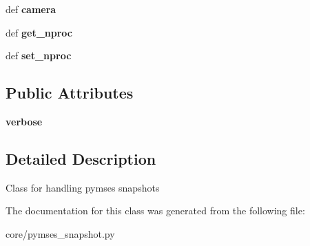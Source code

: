 \begin{DoxyCompactItemize}
\item 
\hypertarget{classseren3_1_1core_1_1pymses__snapshot_1_1PymsesSnapshot_a37f57d298fd6ce7eae2567bd27daf4b8}{
def {\bfseries camera}}
\label{classseren3_1_1core_1_1pymses__snapshot_1_1PymsesSnapshot_a37f57d298fd6ce7eae2567bd27daf4b8}

\item 
\hypertarget{classseren3_1_1core_1_1pymses__snapshot_1_1PymsesSnapshot_aec67f8b60cd90d2e118e163fdf991455}{
def {\bfseries get\_\-nproc}}
\label{classseren3_1_1core_1_1pymses__snapshot_1_1PymsesSnapshot_aec67f8b60cd90d2e118e163fdf991455}

\item 
\hypertarget{classseren3_1_1core_1_1pymses__snapshot_1_1PymsesSnapshot_a322203753f30c91e6ad52dfa06b75e44}{
def {\bfseries set\_\-nproc}}
\label{classseren3_1_1core_1_1pymses__snapshot_1_1PymsesSnapshot_a322203753f30c91e6ad52dfa06b75e44}

\end{DoxyCompactItemize}
\subsection*{Public Attributes}
\begin{DoxyCompactItemize}
\item 
\hypertarget{classseren3_1_1core_1_1pymses__snapshot_1_1PymsesSnapshot_afd83ef6d81e85a4e8ad298003484d5bf}{
{\bfseries verbose}}
\label{classseren3_1_1core_1_1pymses__snapshot_1_1PymsesSnapshot_afd83ef6d81e85a4e8ad298003484d5bf}

\end{DoxyCompactItemize}


\subsection{Detailed Description}
\begin{DoxyVerb}
Class for handling pymses snapshots
\end{DoxyVerb}
 

The documentation for this class was generated from the following file:\begin{DoxyCompactItemize}
\item 
core/pymses\_\-snapshot.py\end{DoxyCompactItemize}

